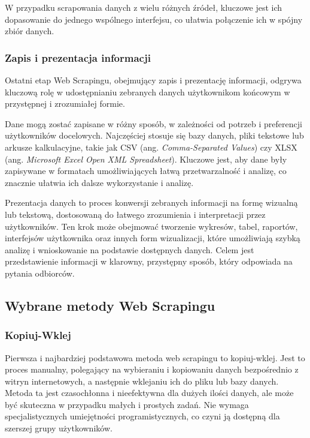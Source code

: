 \noindent W przypadku scrapowania danych z wielu różnych źródeł, kluczowe jest ich dopasowanie do jednego wspólnego interfejsu, co ułatwia połączenie ich w spójny zbiór danych.

\subsubsection{Zapis i prezentacja informacji}

Ostatni etap Web Scrapingu, obejmujący zapis i prezentację informacji, odgrywa kluczową rolę w udostępnianiu zebranych danych użytkownikom końcowym w przystępnej i zrozumiałej formie\cite{iee-state-of-the-art}.

Dane mogą zostać zapisane w różny sposób, w zależności od potrzeb i preferencji użytkowników docelowych.
Najczęściej stosuje się bazy danych, pliki tekstowe lub arkusze kalkulacyjne, takie jak CSV (ang. \emph{Comma-Separated Values}) czy XLSX (ang. \emph{Microsoft Excel Open XML Spreadsheet}).
Kluczowe jest, aby dane były zapisywane w formatach umożliwiających łatwą przetwarzalność i analizę, co znacznie ułatwia ich dalsze wykorzystanie i analizę\cite{iee-state-of-the-art}.

Prezentacja danych to proces konwersji zebranych informacji na formę wizualną lub tekstową, dostosowaną do łatwego zrozumienia i interpretacji przez użytkowników.
Ten krok może obejmować tworzenie wykresów, tabel, raportów, interfejsów użytkownika oraz innych form wizualizacji, które umożliwiają szybką analizę i wnioskowanie na podstawie dostępnych danych.
Celem jest przedstawienie informacji w klarowny, przystępny sposób, który odpowiada na pytania odbiorców.

\subsection{Wybrane metody Web Scrapingu}\label{subsec:web-scraping-methods}

\subsubsection{Kopiuj-Wklej}

Pierwsza i najbardziej podstawowa metoda web scrapingu to kopiuj-wklej.
Jest to proces manualny, polegający na wybieraniu i kopiowaniu danych bezpośrednio z witryn internetowych, a następnie wklejaniu ich do pliku lub bazy danych.
Metoda ta jest czasochłonna i nieefektywna dla dużych ilości danych, ale może być skuteczna w przypadku małych i prostych zadań\cite{state-of-art}.
Nie wymaga specjalistycznych umiejętności programistycznych, co czyni ją dostępną dla szerszej grupy użytkowników.

